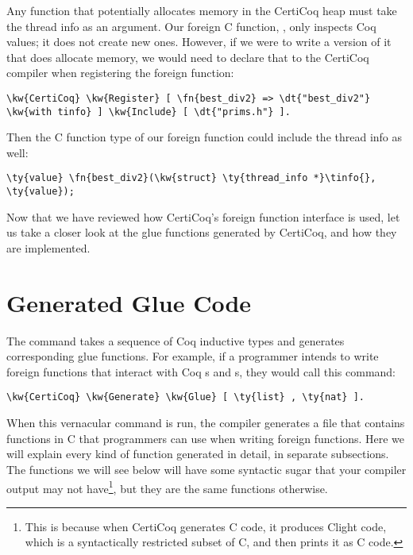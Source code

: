 Any function that potentially allocates memory in the \gls{CertiCoq heap} must take the \gls{thread info} as an argument. Our foreign C function, , only inspects Coq values; it does not create new ones. However, if we were to write a version of it that does allocate memory, we would need to declare that to the CertiCoq compiler when registering the foreign function:

\begin{Verbatim}
\kw{CertiCoq} \kw{Register} [ \fn{best_div2} => \dt{"best_div2"} \kw{with tinfo} ] \kw{Include} [ \dt{"prims.h"} ].
\end{Verbatim}

Then the C function type of our foreign function could include the \gls{thread info} as well:

\begin{Verbatim}
\ty{value} \fn{best_div2}(\kw{struct} \ty{thread_info *}\tinfo{}, \ty{value});
\end{Verbatim}

Now that we have reviewed how CertiCoq's foreign function interface is used, let us take a closer look at the glue functions generated by CertiCoq, and how they are implemented.

\section{Generated Glue Code}\label{glue}

The  command takes a sequence of Coq \gls{inductive type}s and generates corresponding glue functions. For example, if a programmer intends to write foreign functions that interact with Coq s and s, they would call this command:

\begin{Verbatim}
\kw{CertiCoq} \kw{Generate} \kw{Glue} [ \ty{list} , \ty{nat} ].
\end{Verbatim}

When this vernacular command is run, the compiler generates a file that contains functions in C that programmers can use when writing foreign functions. Here we will explain every kind of function generated in detail, in separate subsections. The functions we will see below will have some syntactic sugar that your compiler output may not have\footnote{This is because when CertiCoq generates C code, it produces Clight code, which is a syntactically restricted subset of C, and then prints it as C code.}, but they are the same functions otherwise.

